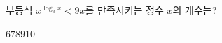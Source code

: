부등식 $x^{\log_3 x}<9x$를 만족시키는 정수 $x$의 개수는?
\begin{choices32}{$6$}{$7$}{$8$}{$9$}{$10$}\end{choices32}
